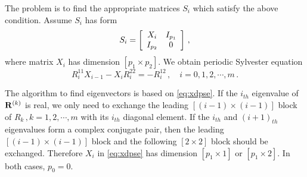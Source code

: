\documentclass[final,leqno,onefignum,onetabnum]{siamltexmm}
\begin{document}
The problem is to find the appropriate matrices $S_{i}$ which satisfy
the above condition. Assume $S_{i}$ has form
\[
S_{i}=
\left[
\begin{array}{c c}
  X_{i} & I_{p_{1}} \\
  I_{p_{2}} & 0
\end{array}
\right]
\,,
\]
where matrix $X_{i}$ has dimension $[p_{1}\!\times\! p_{2}]$. We obtain
periodic Sylvester equation
\begin{equation}
  \label{eq:xdpse}
  R^{11}_{i}X_{i-1}-X_{i}R^{22}_{i}=-R^{12}_{i}
  \,,\quad i=0,1,2,\cdots,m
  \,.
\end{equation}

The algorithm to find eigenvectors is based on \eqref{eq:xdpse}. If the
$i_{th}$ eigenvalue of $\mathbf{R}^{(k)}$ is real, we only need to exchange the
{leading} $[(i-1)\!\times\! (i-1)]$ block of $R_{k}\,,k=1,2,\cdots,m$ with
its $i_{th}$ diagonal element. If the $i_{th}$ and $(i+1)_{th}$
eigenvalues form a complex conjugate pair,
then the {leading} $[(i-1)\!\times\! (i-1)]$
block and the following $[2\!\times\! 2]$ block should be exchanged.
Therefore $X_{i}$ in \eqref{eq:xdpse} has dimension $[p_{1}\!\times\! 1]$
or $[p_{1}\!\times\! 2]$. In both cases, $p_{0}=0$.
\end{document}
